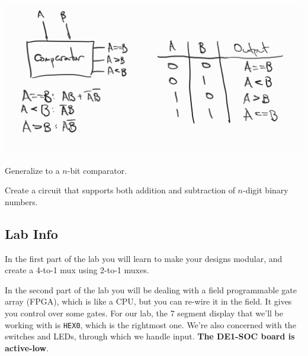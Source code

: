\includegraphics{csc258/figures/1bitcomparator.jpg}

\begin{exercise}
Generalize to a $n$-bit comparator. 
\end{exercise}

\begin{exercise}
Create a circuit that supports both addition and subtraction of $n$-digit binary numbers.
\end{exercise}

\subsection*{Lab Info}

In the first part of the lab you will learn to make your designs modular, and create a 4-to-1 mux using 2-to-1 muxes.

In the second part of the lab you will be dealing with a field programmable gate array (FPGA), which is like a CPU, but you can re-wire it in the field. It gives you control over some gates. For our lab, the 7 segment display that we'll be working with is \texttt{HEX0}, which is the rightmost one. We're also concerned with the switches and LEDs, through which we handle input. \textbf{The DE1-SOC board is active-low}.

